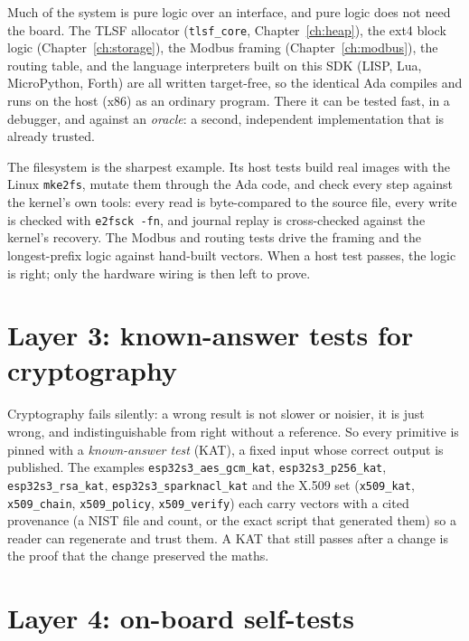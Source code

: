 Much of the system is pure logic over an interface, and pure logic does not need the
board. The TLSF allocator (\texttt{tlsf\_core}, Chapter~\ref{ch:heap}), the ext4 block
logic (Chapter~\ref{ch:storage}), the Modbus framing (Chapter~\ref{ch:modbus}), the
routing table, and the language interpreters built on this SDK
(LISP, Lua, MicroPython, Forth) are all written target-free, so the identical Ada compiles and runs on
the host (x86) as an ordinary program. There it can be tested fast, in a debugger,
and against an \emph{oracle}: a second, independent implementation that is already
trusted.

The filesystem is the sharpest example. Its host tests build real images with the
Linux \texttt{mke2fs}, mutate them through the Ada code, and check every step against
the kernel's own tools: every read is byte-compared to the source file, every write
is checked with \texttt{e2fsck -fn}, and journal replay is cross-checked against the
kernel's recovery. The Modbus and routing tests drive the framing and the
longest-prefix logic against hand-built vectors. When a host test passes, the logic is right; only the
hardware wiring is then left to prove.

\section{Layer 3: known-answer tests for cryptography}

Cryptography fails silently: a wrong result is not slower or noisier, it is just
wrong, and indistinguishable from right without a reference. So every primitive is
pinned with a \emph{known-answer test} (KAT), a fixed input whose correct output is
published. The examples \texttt{esp32s3\_aes\_gcm\_kat}, \texttt{esp32s3\_p256\_kat},
\texttt{esp32s3\_rsa\_kat}, \texttt{esp32s3\_sparknacl\_kat} and the X.509 set
(\texttt{x509\_kat}, \texttt{x509\_chain}, \texttt{x509\_policy},
\texttt{x509\_verify}) each carry vectors with a cited provenance (a NIST file and
count, or the exact script that generated them) so a reader can regenerate and trust
them. A KAT that still passes after a change is the proof that the change preserved
the maths.

\section{Layer 4: on-board self-tests}

